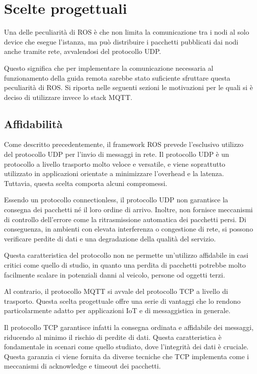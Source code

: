 \section{Scelte progettuali}
Una delle peculiarità di ROS è che non limita la comunicazione tra i nodi al solo device che esegue l'istanza, ma può distribuire i pacchetti pubblicati dai nodi anche tramite rete, avvalendosi del protocollo UDP. 

Questo significa che per implementare la comunicazione necessaria al funzionamento della guida remota sarebbe stato suficiente sfruttare questa peculiarità di ROS. Si riporta nelle seguenti sezioni le motivazioni per le quali si è deciso di utilizzare invece lo stack MQTT.

\subsection{Affidabilità}
Come descritto precedentemente, il framework ROS prevede l'esclusivo utilizzo del protocollo UDP per l'invio di messaggi in rete. Il protocollo UDP è un protocollo a livello trasporto molto veloce e versatile, e viene soprattutto utilizzato in applicazioni orientate a minimizzare l'overhead e la latenza. Tuttavia, questa scelta comporta alcuni compromessi. 

\noindent Essendo un protocollo connectionless, il protocollo UDP non garantisce la consegna dei pacchetti né il loro ordine di arrivo. Inoltre, non fornisce meccanismi di controllo dell'errore come la ritrasmissione automatica dei pacchetti persi. Di conseguenza, in ambienti con elevata interferenza o congestione di rete, si possono verificare perdite di dati e una degradazione della qualità del servizio.

\noindent Questa caratteristica del protocollo non ne permette un'utilizzo affidabile in casi critici come quello di studio, in quanto una perdita di pacchetti potrebbe molto facilmente scalare in potenziali danni al veicolo, persone od oggetti terzi.

\noindent Al contrario, il protocollo MQTT si avvale del protocollo TCP a livello di trasporto. Questa scelta progettuale offre una serie di vantaggi che lo rendono particolarmente adatto per applicazioni IoT e di messaggistica in generale.

\noindent Il protocollo TCP garantisce infatti la consegna ordinata e affidabile dei messaggi, riducendo al minimo il rischio di perdite di dati. Questa caratteristica è fondamentale in scenari come quello studiato, dove l'integrità dei dati è cruciale. Questa garanzia ci viene fornita da diverse tecniche che TCP implementa come i meccanismi di acknowledge e timeout dei pacchetti. 

